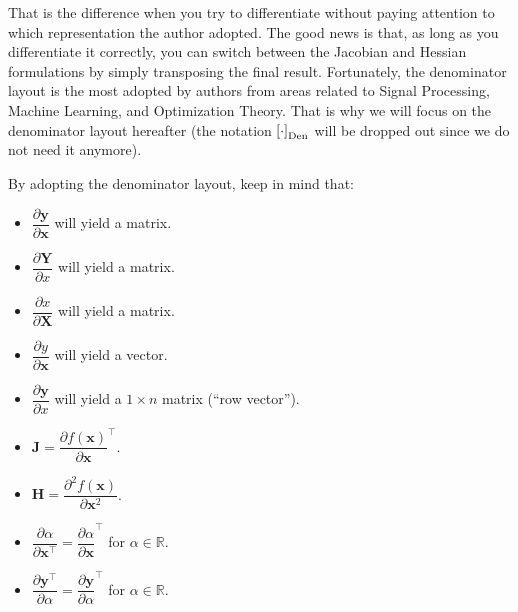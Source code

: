 \documentclass{article}
\newcommand{\trans}{\top}
\begin{document}
That is the difference when you try to differentiate without paying attention to which representation the author adopted. The good news is that, as long as you differentiate it correctly, you can switch between the Jacobian and Hessian formulations by simply transposing the final result. Fortunately, the denominator layout is the most adopted by authors from areas related to Signal Processing, Machine Learning, and Optimization Theory. That is why we will focus on the denominator layout hereafter (the notation \(\left[\cdot\right]_{\textnormal{Den}}\) will be dropped out since we do not need it anymore). %

By adopting the denominator layout, keep in mind that:
\begin{itemize}
    \item \(\dfrac{\partial \mathbf{y}}{\partial \mathbf{x}}\) will yield a matrix.
    \item \(\dfrac{\partial \mathbf{Y}}{\partial x}\) will yield a matrix.
    \item \(\dfrac{\partial x}{\partial \mathbf{X}}\) will yield a matrix.
    \item \(\dfrac{\partial y}{\partial \mathbf{x}}\) will yield a vector.
    \item \(\dfrac{\partial \mathbf{y}}{\partial x}\) will yield a \(1\times n\) matrix (``row vector'').
    \item \(\mathbf{J} = \dfrac{\partial f(\mathbf{x})}{\partial \mathbf{x}}^\top\).
    \item \(\mathbf{H} = \dfrac{\partial^{2} f(\mathbf{x})}{\partial \mathbf{x}^2}\).
    \item \(\dfrac{\partial\alpha}{\partial \mathbf{x}^\top} = \dfrac{\partial\alpha}{\partial \mathbf{x}}^\top\) for \(\alpha\in \mathbb{R}\).
    \item \(\dfrac{\partial \mathbf{y}^\top}{\partial \alpha} = \dfrac{\partial \mathbf{y}}{\partial \alpha}^\top\) for \(\alpha\in \mathbb{R}\).
\end{itemize}
\end{document}
